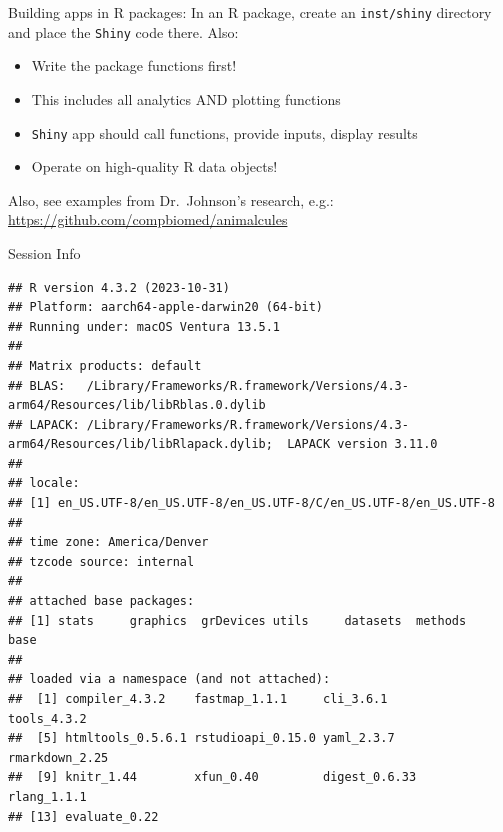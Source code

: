 \documentclass[
  ignorenonframetext,
]{beamer}
\providecommand{\tightlist}{%
  \setlength{\itemsep}{0pt}\setlength{\parskip}{0pt}}
\begin{document}
\begin{frame}[fragile]{Building apps in R packages:}
\label{building-apps-in-r-packages}
In an R package, create an \texttt{inst/shiny} directory and place the
\texttt{Shiny} code there. Also:

\begin{itemize}
\tightlist
\item
  Write the package functions first!
\item
  This includes all analytics AND plotting functions
\item
  \texttt{Shiny} app should call functions, provide inputs, display
  results
\item
  Operate on high-quality R data objects!
\end{itemize}

Also, see examples from Dr.~Johnson's research, e.g.:
\url{https://github.com/compbiomed/animalcules}
\end{frame}

\begin{frame}[fragile]{Session Info}
\label{session-info}
\tiny

\begin{verbatim}
## R version 4.3.2 (2023-10-31)
## Platform: aarch64-apple-darwin20 (64-bit)
## Running under: macOS Ventura 13.5.1
## 
## Matrix products: default
## BLAS:   /Library/Frameworks/R.framework/Versions/4.3-arm64/Resources/lib/libRblas.0.dylib 
## LAPACK: /Library/Frameworks/R.framework/Versions/4.3-arm64/Resources/lib/libRlapack.dylib;  LAPACK version 3.11.0
## 
## locale:
## [1] en_US.UTF-8/en_US.UTF-8/en_US.UTF-8/C/en_US.UTF-8/en_US.UTF-8
## 
## time zone: America/Denver
## tzcode source: internal
## 
## attached base packages:
## [1] stats     graphics  grDevices utils     datasets  methods   base     
## 
## loaded via a namespace (and not attached):
##  [1] compiler_4.3.2    fastmap_1.1.1     cli_3.6.1         tools_4.3.2      
##  [5] htmltools_0.5.6.1 rstudioapi_0.15.0 yaml_2.3.7        rmarkdown_2.25   
##  [9] knitr_1.44        xfun_0.40         digest_0.6.33     rlang_1.1.1      
## [13] evaluate_0.22
\end{verbatim}
\end{frame}
\end{document}
